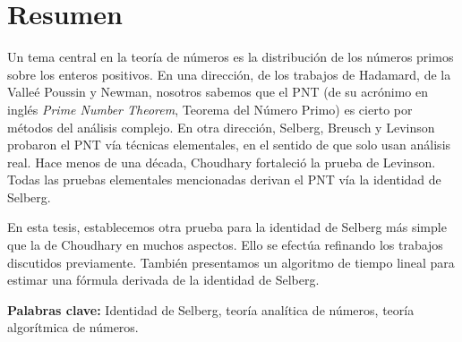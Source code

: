 \chapter*{Resumen}
Un tema central en la teor\'ia de n\'umeros es la distribuci\'on
de los n\'umeros primos sobre los enteros positivos.
En una direcci\'on,
de los trabajos de
Hadamard, de la Valle\'e Poussin y Newman,
nosotros sabemos que el PNT
(de su acrónimo en inglés \textit{Prime Number Theorem}, Teorema del N\'umero Primo)
es cierto por m\'etodos del an\'alisis complejo.
En otra direcci\'on,
Selberg, Breusch y Levinson probaron el PNT
v\'ia t\'ecnicas elementales, en el sentido de que solo usan an\'alisis real.
Hace menos de una d\'ecada,
Choudhary fortaleci\'o la prueba de Levinson.
Todas las pruebas elementales mencionadas
derivan el PNT v\'ia la identidad de Selberg.

En esta tesis,
establecemos otra prueba para
la identidad de Selberg
m\'as simple que la de Choudhary en muchos aspectos.
Ello se efect\'ua
refinando los trabajos discutidos previamente.
Tambi\'en presentamos un algoritmo de tiempo lineal
para estimar una f\'ormula derivada de la identidad de Selberg.

\bigskip
\textbf{Palabras clave:}
Identidad de Selberg,
teor\'ia anal\'itica de n\'umeros,
teor\'ia algor\'itmica de n\'umeros.
